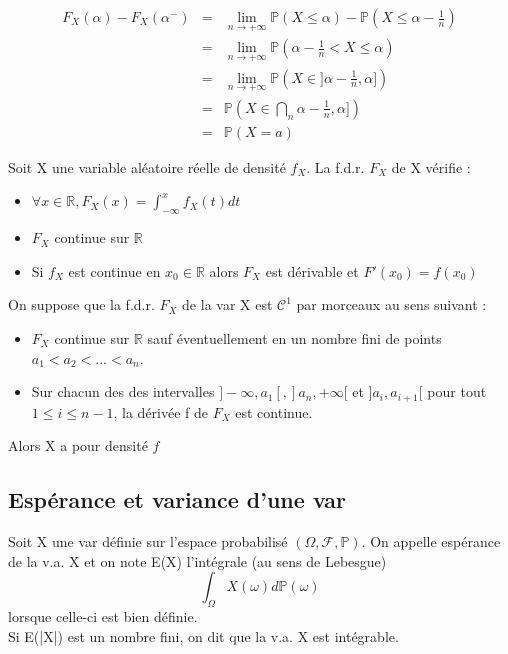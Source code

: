 \begin{dem}
\begin{eqnarray*}
F_X(\alpha)-F_X(\alpha^-)&=&\lim_{n\to +\infty} \mathbb{P}(X\leq \alpha) -\mathbb{P}(X \leq \alpha - \frac{1}{n}) \\
&=& \lim_{n\to +\infty} \mathbb{P}(\alpha - \frac{1}{n} < X\leq \alpha) \\
&=& \lim_{n\to +\infty} \mathbb{P}(X \in ]\alpha-\frac{1}{n}, \alpha]) \\
&=& \mathbb{P}(X \in \bigcap_n \alpha-\frac{1}{n}, \alpha]) \\
&=& \mathbb{P}(X = a)
\end{eqnarray*}
\end{dem}

\begin{Prop}
Soit X une variable aléatoire réelle de densité $f_X$. La f.d.r. $F_X$ de X vérifie :
\begin{itemize}
\item $\forall x\in \mathbb{R}, F_X(x)=\int_{-\infty}^x f_X(t)dt$
\item $F_X$ continue sur $\mathbb{R}$
\item Si $f_X$ est continue en $x_0 \in \mathbb{R}$ alors $F_X$ est dérivable et $F'(x_0)=f(x_0)$
\end{itemize}
\end{Prop}

\begin{Prop}
On suppose que la f.d.r. $F_X$ de la var X est $\mathcal{C}^1$ par morceaux au sens suivant :
\begin{itemize}
\item $F_X$ continue sur $\mathbb{R}$ sauf éventuellement en un nombre fini de points $a_1<a_2<...<a_n$.
\item Sur chacun des des intervalles $]-\infty,a_1[,]a_n,+\infty[$ et $]a_i, a_{i+1}[$ pour tout $1 \leq i \leq n-1$, la dérivée f de $F_X$ est continue.
\end{itemize}
Alors X a pour densité $f$
\end{Prop}

\subsection{Espérance et variance d'une var}
\begin{Def}
Soit X une var définie sur l'espace probabilisé $(\Omega, \mathcal{F}, \mathbb{P})$. On appelle espérance de la v.a. X et on note E(X) l'intégrale (au sens de Lebesgue) \[\int_{\Omega} X(\omega) d\mathbb{P}(\omega)\] lorsque celle-ci est bien définie. \\
Si E(|X|) est un nombre fini, on dit que la v.a. X est intégrable.
\end{Def}

